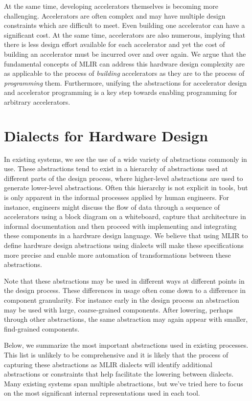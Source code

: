 \documentclass{tufte-handout}
\begin{document}
At the same time, developing accelerators themselves is becoming more challenging\cite{berkeley06dwarfs}.  Accelerators are often complex and may have multiple design constraints which are difficult to meet.  Even building one accelerator can have a significant cost.  At the same time, accelerators are also numerous, implying that there is less design effort available for each accelerator and yet the cost of building an accelerator must be incurred over and over again.  We argue that the fundamental concepts of MLIR can address this hardware design complexity are as applicable to the process of \emph{building} accelerators as they are to the process of \emph{programming} them.  Furthermore, unifying the abstractions for accelerator design and accelerator programming is a key step towards enabling programming for arbitrary accelerators. 

\section{Dialects for Hardware Design}\label{sec:dialects}

In existing systems, we see the use of a wide variety of abstractions commonly in use. These abstractions tend to exist in a hierarchy of abstractions used at different parts of the design process, where higher-level abstractions are used to generate lower-level abstractions.  Often this hierarchy is not explicit in tools, but is only apparent in the informal processes applied by human engineers.  For instance, engineers might discuss the flow of data through a sequence of accelerators using a block diagram on a whiteboard, capture that architecture in informal documentation and then proceed with implementing and integrating these components in a hardware design language.  We believe that using MLIR to define hardware design abstractions using dialects will make these specifications more precise and enable more automation of transformations between these abstractions.

Note that these abstractions may be used in different ways at different points in the design process. These differences in usage often come down to a difference in component granularity.  For instance early in the design process an abstraction may be used with large, coarse-grained components. After lowering, perhaps through other abstractions, the same abstraction may again appear with smaller, find-grained components.\cite{ptolemy14SystemDesign}

Below, we summarize the most important abstractions used in existing processes.  This list is unlikely to be comprehensive and it is likely that the process of capturing these abstractions as MLIR dialects will identify additional abstractions or constraints that help facilitate the lowering between dialects.  Many existing systems span multiple abstractions, but we've tried here to focus on the most significant internal representations used in each tool.
\end{document}
